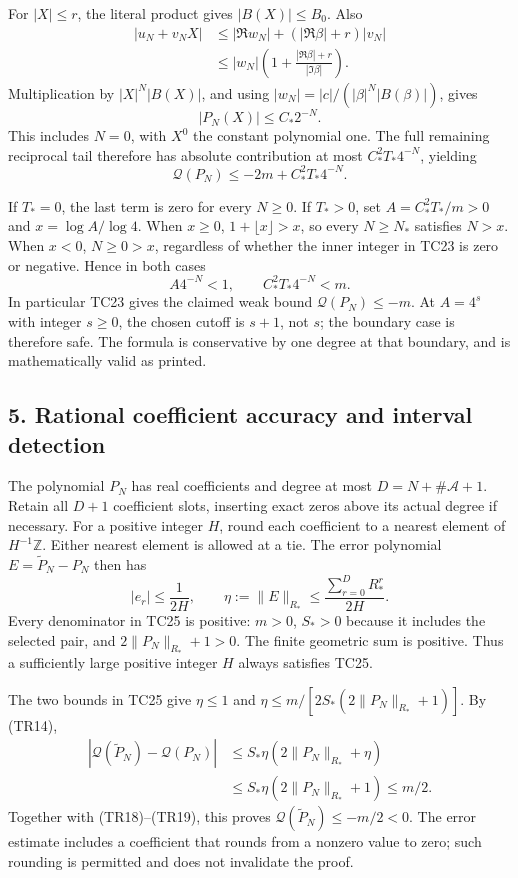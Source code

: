 For \(|X|\le r\), the literal product gives \(|B(X)|\le B_0\). Also \[
\begin{aligned}
|u_N+v_NX|
&\le |\Re w_N|+(|\Re\beta|+r)|v_N|\\
&\le |w_N|\left(1+\frac{|\Re\beta|+r}{|\Im\beta|}\right).
\end{aligned}
\tag{TR16}
\] Multiplication by \(|X|^N|B(X)|\), and using \(|w_N|=|c|/(|\beta|^N|B(\beta)|)\), gives \[
|P_N(X)|\le C_*2^{-N}.
\tag{TR17}
\] This includes \(N=0\), with \(X^0\) the constant polynomial one. The full remaining reciprocal tail therefore has absolute contribution at most \(C_*^2T_*4^{-N}\), yielding \[
\mathcal Q(P_N)\le-2m+C_*^2T_*4^{-N}.
\tag{TR18}
\]

If \(T_*=0\), the last term is zero for every \(N\ge0\). If \(T_*>0\), set \(A=C_*^2T_*/m>0\) and \(x=\log A/\log4\). When \(x\ge0\), \(1+\lfloor x\rfloor>x\), so every \(N\ge N_*\) satisfies \(N>x\). When \(x<0\), \(N\ge0>x\), regardless of whether the inner integer in TC23 is zero or negative. Hence in both cases \[
A4^{-N}<1,\qquad C_*^2T_*4^{-N}<m.
\tag{TR19}
\] In particular TC23 gives the claimed weak bound \(\mathcal Q(P_N)\le-m\). At \(A=4^s\) with integer \(s\ge0\), the chosen cutoff is \(s+1\), not \(s\); the boundary case is therefore safe. The formula is conservative by one degree at that boundary, and is mathematically valid as printed.

\subsection{5. Rational coefficient accuracy and interval detection}\label{C47stage:TCReview:rational-coefficient-accuracy-and-interval-detection}

The polynomial \(P_N\) has real coefficients and degree at most \(D=N+\#\mathcal A+1\). Retain all \(D+1\) coefficient slots, inserting exact zeros above its actual degree if necessary. For a positive integer \(H\), round each coefficient to a nearest element of \(H^{-1}\mathbb Z\). Either nearest element is allowed at a tie. The error polynomial \(E=\widetilde P_N-P_N\) then has \[
|e_r|\le\frac1{2H},\qquad
\eta:=\|E\|_{R_*}\le
\frac{\sum_{r=0}^{D}R_*^r}{2H}.
\tag{TR20}
\] Every denominator in TC25 is positive: \(m>0\), \(S_*>0\) because it includes the selected pair, and \(2\|P_N\|_{R_*}+1>0\). The finite geometric sum is positive. Thus a sufficiently large positive integer \(H\) always satisfies TC25.

The two bounds in TC25 give \(\eta\le1\) and \(\eta\le m/[2S_*(2\|P_N\|_{R_*}+1)]\). By (TR14), \[
\begin{aligned}
|\mathcal Q(\widetilde P_N)-\mathcal Q(P_N)|
&\le S_*\eta(2\|P_N\|_{R_*}+\eta)\\
&\le S_*\eta(2\|P_N\|_{R_*}+1)\le m/2.
\end{aligned}
\tag{TR21}
\] Together with (TR18)--(TR19), this proves \(\mathcal Q(\widetilde P_N)\le-m/2<0\). The error estimate includes a coefficient that rounds from a nonzero value to zero; such rounding is permitted and does not invalidate the proof.

